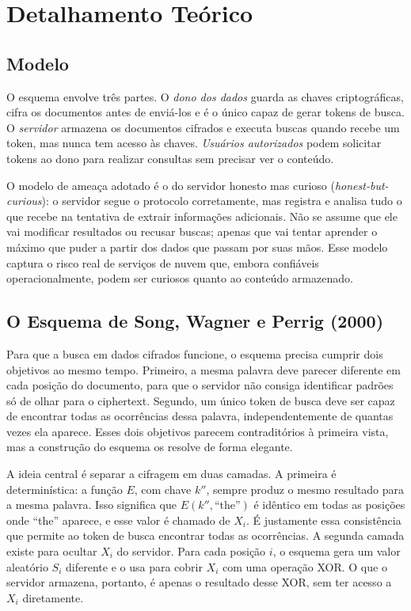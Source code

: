 \documentclass[
  12pt,
  oneside,
  a4paper,
  brazil
]{abntex2}
\begin{document}
\chapter{Detalhamento Teórico}

\section{Modelo}

O esquema envolve três partes. O \textit{dono dos dados} guarda as
chaves criptográficas, cifra os documentos antes de enviá-los e é o
único capaz de gerar tokens de busca. O \textit{servidor} armazena os
documentos cifrados e executa buscas quando recebe um token, mas
nunca tem acesso às chaves. \textit{Usuários autorizados} podem
solicitar tokens ao dono para realizar consultas sem precisar ver o
conteúdo.

O modelo de ameaça adotado é o do servidor honesto mas curioso
(\textit{honest-but-curious}): o servidor segue o protocolo
corretamente, mas registra e analisa tudo o que recebe na tentativa de
extrair informações adicionais. Não se assume que ele vai modificar
resultados ou recusar buscas; apenas que vai tentar aprender o máximo
que puder a partir dos dados que passam por suas mãos. Esse modelo
captura o risco real de serviços de nuvem que, embora confiáveis
operacionalmente, podem ser curiosos quanto ao conteúdo armazenado.

\section{O Esquema de Song, Wagner e Perrig (2000)}

Para que a busca em dados cifrados funcione, o esquema precisa cumprir
dois objetivos ao mesmo tempo. Primeiro, a mesma palavra deve parecer
diferente em cada posição do documento, para que o servidor não
consiga identificar padrões só de olhar para o ciphertext. Segundo,
um único token de busca deve ser capaz de encontrar todas as
ocorrências dessa palavra, independentemente de quantas vezes ela
aparece. Esses dois objetivos parecem contraditórios à primeira vista,
mas a construção do esquema os resolve de forma elegante.

A ideia central é separar a cifragem em duas camadas. A primeira é
determinística: a função $E$, com chave $k''$, sempre produz o mesmo
resultado para a mesma palavra. Isso significa que $E(k'', \text{``the''})$
é idêntico em todas as posições onde ``the'' aparece, e esse valor é
chamado de $X_i$. É justamente essa consistência que permite ao token
de busca encontrar todas as ocorrências. A segunda camada existe para
ocultar $X_i$ do servidor. Para cada posição $i$, o esquema gera um
valor aleatório $S_i$ diferente e o usa para cobrir $X_i$ com uma
operação XOR. O que o servidor armazena, portanto, é apenas o
resultado desse XOR, sem ter acesso a $X_i$ diretamente.
\end{document}
